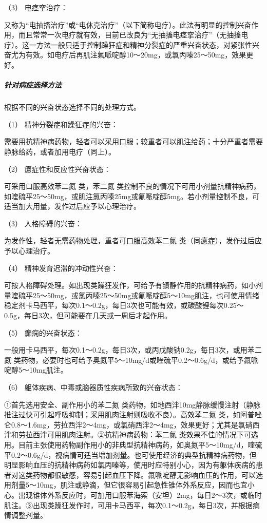 \hypertarget{text00043.htmlux5cux23CHP1-18-1-3-1-3}{}
（3） 电痉挛治疗：

又称为“电抽搐治疗”或“电休克治疗”（以下简称电疗）。此法有明显的控制兴奋作用，而且常常一次电疗就有效，目前已改良为“无抽搐电痉挛治疗”（无抽搐电疗）。这一方法一般只适于控制躁狂症和精神分裂症的严重兴奋状态，对紧张性兴奋尤为有效。如电疗后再肌注氟哌啶醇10～20mg，或氯丙嗪25～50mg，效果更好。

\subparagraph{针对病症选择方法}

根据不同的兴奋状态选择不同的处理方式。

\hypertarget{text00043.htmlux5cux23CHP1-18-1-3-2-1}{}
（1） 精神分裂症和躁狂症的兴奋：

需要用抗精神病药物，轻者可以采用口服；较重者可以肌注给药；十分严重者需要静脉给药，或者加用电疗（同上）。

\hypertarget{text00043.htmlux5cux23CHP1-18-1-3-2-2}{}
（2） 癔症性和反应性兴奋状态：

可采用口服高效苯二氮{} 类，苯二氮{}
类控制不良的情况下可用小剂量抗精神病药，如喹硫平25～50mg，或肌注氯丙嗪25mg或氟哌啶醇5mg。若小剂量控制不良，可适当加大用量，发作过后应予以心理治疗。

\hypertarget{text00043.htmlux5cux23CHP1-18-1-3-2-3}{}
（3） 人格障碍的兴奋：

为发作性，轻者无需药物处理，重者可口服高效苯二氮{}
类（同癔症），发作过后应予以心理治疗。

\hypertarget{text00043.htmlux5cux23CHP1-18-1-3-2-4}{}
（4） 精神发育迟滞的冲动性兴奋：

可按人格障碍处理。如出现类躁狂发作，可给予有镇静作用的抗精神病药，如小剂量喹硫平25～50mg，或氯丙嗪25～50mg或氟哌啶醇5～10mg肌注，也可使用情绪稳定剂卡马西平，每次0.1～0.2g，每日3次也可能有效，或碳酸锂每次0.25～0.5g，每日3次，但可能要在几天或一周后才起作用。

\hypertarget{text00043.htmlux5cux23CHP1-18-1-3-2-5}{}
（5） 癫痫的兴奋状态：

一般用卡马西平，每次0.1～0.2g，每日3次，或丙戊酸钠0.2g，每日3次，或用苯二氮{}
类药物，必要时也可给予奥氮平5～10mg/d或喹硫平0.2～0.6g/d，或给予氟哌啶醇5～10mg肌注。

\hypertarget{text00043.htmlux5cux23CHP1-18-1-3-2-6}{}
（6） 躯体疾病、中毒或脑器质性疾病所致的兴奋状态：

①首先选用安全、副作用小的苯二氮{}
类药物，如地西泮10mg静脉缓慢注射（静脉推注过快可引起呼吸抑制；采用肌肉注射则吸收不良）。高效苯二氮{}
类，如阿普唑仑0.8～1.6mg，劳拉西泮2～4mg，或氯硝西泮2～4mg，效果更好；尤其是氯硝西泮和劳拉西泮可用肌肉注射。②抗精神病药物：苯二氮{}
类效果不佳的情况下可选用。目前主张使用药物副作用小的非典型抗精神病药，如奥氮平5～10mg/d，喹硫平0.2～0.6g/d，视病情可适当增加剂量。也可使用经济的典型抗精神病药物，但明显影响血压的抗精神病药如氯丙嗪等，使用时应特别小心，因为有躯体疾病的患者对这类药物都很敏感，容易引起血压下降。氟哌啶醇无影响血压的作用，可以选用剂量5～10mg，肌注或静滴，但它很容易引起急性锥体外系反应，因而也宜小心。出现锥体外系反应时，可加用口服苯海索（安坦）2mg，每日2～3次，或临时肌注。③出现类躁狂发作时，可用卡马西平，每次0.1～0.2g，每日3次，并根据病情调整剂量。

